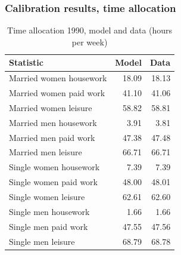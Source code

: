 \documentclass{beamer}
\begin{document}
\begin{frame}
	\frametitle{Calibration results, time allocation}
	\scriptsize
	\begin{table}[htbp]
		\centering
		\caption{Time allocation 1990, model and data (hours per week)}
		\begin{tabular}{lrr}
			\toprule
			Statistic & \multicolumn{1}{l}{Model} & \multicolumn{1}{l}{Data} \\
			\midrule
			Married women housework & 18.09 & 18.13 \\
			Married women paid work & 41.10 & 41.06 \\
			Married women leisure & 58.82 & 58.81 \\
			Married men housework & 3.91  & 3.81 \\
			Married men paid work & 47.38 & 47.48 \\
			Married men leisure & 66.71 & 66.71 \\
			Single women housework & 7.39  & 7.39 \\
			Single women paid work & 48.00 & 48.01 \\
			Single women leisure & 62.61 & 62.60 \\
			Single men housework & 1.66  & 1.66 \\
			Single men paid work & 47.55 & 47.56 \\
			Single men leisure & 68.79 & 68.78 \\
			\bottomrule
			\bottomrule
		\end{tabular}
	\end{table}
\end{frame}
\end{document}
